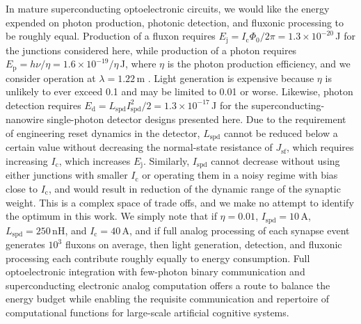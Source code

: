 \documentclass[twocolumn]{article}
\begin{document}
In mature superconducting optoelectronic circuits, we would like the energy expended on photon production, photonic detection, and fluxonic processing to be roughly equal. Production of a fluxon requires $E_{\mathrm{j}} = I_{\mathrm{c}}\Phi_0/2\pi = 1.3\times 10^{-20}$\,J for the junctions considered here, while production of a photon requires $E_{\mathrm{p}} = h\nu/\eta = 1.6\times 10^{-19}/\eta$\,J, where $\eta$ is the photon production efficiency, and we consider operation at $\lambda = 1.22$\,\textmu m \cite{buch2017}. Light generation is expensive because $\eta$ is unlikely to ever exceed 0.1 and may be limited to 0.01 or worse. Likewise, photon detection requires $E_{\mathrm{d}} = L_{\mathrm{spd}}I_{\mathrm{spd}}^2/2 = 1.3\times 10^{-17}$\,J for the superconducting-nanowire single-photon detector designs presented here. Due to the requirement of engineering reset dynamics in the detector, $L_{\mathrm{spd}}$ cannot be reduced below a certain value without decreasing the normal-state resistance of $J_{\mathrm{sf}}$, which requires increasing $I_{\mathrm{c}}$, which increases $E_{\mathrm{j}}$. Similarly, $I_{\mathrm{spd}}$ cannot decrease without using either junctions with smaller $I_{\mathrm{c}}$ or operating them in a noisy regime with bias close to $I_{\mathrm{c}}$, and would result in reduction of the dynamic range of the synaptic weight. This is a complex space of trade offs, and we make no attempt to identify the optimum in this work. We simply note that if $\eta = 0.01$, $I_{\mathrm{spd}} = 10$\,\textmu A, $L_{\mathrm{spd}} = 250$\,nH, and $I_{\mathrm{c}} = 40$\,\textmu A, and if full analog processing of each synapse event generates $10^3$ fluxons on average, then light generation, detection, and fluxonic processing each contribute roughly equally to energy consumption. Full optoelectronic integration with few-photon binary communication and superconducting electronic analog computation offers a route to balance the energy budget while enabling the requisite communication and repertoire of computational functions for large-scale artificial cognitive systems.
\end{document}
